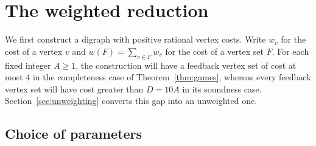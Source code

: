 \section{The weighted reduction}
\label{sec:construction}

We first construct a digraph with positive rational vertex costs.  Write
$w_v$ for the cost of a vertex $v$ and $w(F)=\sum_{v\in F}w_v$ for the cost
of a vertex set $F$.  For each
fixed integer $A\ge 1$, the construction will have a feedback vertex set of
cost at most $4$ in the completeness case of Theorem~\ref{thm:games}, whereas
every feedback vertex set will have cost greater than $D=10A$ in its soundness
case.  Section~\ref{sec:unweighting} converts this gap into an unweighted one.

\subsection{Choice of parameters}
\label{sec:parameters}

